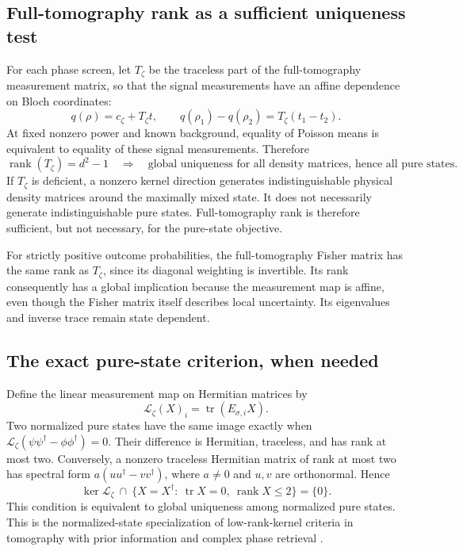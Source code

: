 \documentclass[11pt,a4paper]{article}
\newcommand{\tr}{\operatorname{tr}}
\newcommand{\rank}{\operatorname{rank}}
\begin{document}
\subsection{Full-tomography rank as a sufficient uniqueness test}
For each phase screen, let $T_\zeta$ be the traceless part of the
full-tomography measurement matrix, so that the signal measurements have
an affine dependence on Bloch coordinates:
\begin{equation}
 q(\rho)=c_\zeta+T_\zeta t,\qquad
 q(\rho_1)-q(\rho_2)=T_\zeta(t_1-t_2).
\end{equation}
At fixed nonzero power and known background, equality of Poisson means
is equivalent to equality of these signal measurements. Therefore
\begin{equation}
 \rank(T_\zeta)=d^2-1
 \quad\Longrightarrow\quad
 \text{global uniqueness for all density matrices, hence all pure states}.
 \label{eq:full-rank-sufficient}
\end{equation}
If $T_\zeta$ is deficient, a nonzero kernel direction generates
indistinguishable physical density matrices around the maximally mixed
state. It does not necessarily generate indistinguishable pure states.
Full-tomography rank is therefore sufficient, but not necessary, for the
pure-state objective.

For strictly positive outcome probabilities, the full-tomography Fisher
matrix has the same rank as $T_\zeta$, since its diagonal weighting is
invertible. Its rank consequently has a global implication because the
measurement map is affine, even though the Fisher matrix itself describes
local uncertainty. Its eigenvalues and inverse trace remain state dependent.

\subsection{The exact pure-state criterion, when needed}
Define the linear measurement map on Hermitian matrices by
\begin{equation}
 \mathcal L_\zeta(X)_i=\tr(E_{\sigma,i}X).
\end{equation}
Two normalized pure states have the same image exactly when
$\mathcal L_\zeta(\psi\psi^\dagger-\phi\phi^\dagger)=0$.
Their difference is Hermitian, traceless, and has rank at most two.
Conversely, a nonzero traceless Hermitian matrix of rank at most two has
spectral form $a(uu^\dagger-vv^\dagger)$, where $a\ne0$ and $u,v$ are
orthonormal. Hence
\begin{equation}
\boxed{\ker\mathcal L_\zeta\ \cap\
 \{X=X^\dagger:\ \tr X=0,\ \rank X\le2\}=\{0\}.}
\end{equation}
This condition is equivalent to global uniqueness among normalized pure states.
This is the normalized-state specialization of low-rank-kernel criteria
in tomography with prior information and complex phase retrieval
\cite{heinosaari2013,conca2015}.
\end{document}
